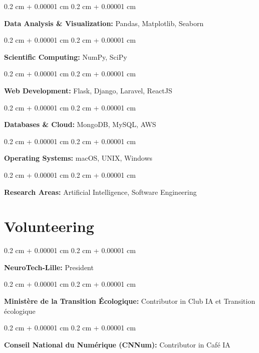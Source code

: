 \documentclass[10pt, letterpaper]{article}
\newenvironment{onecolentry}{
    \begin{adjustwidth}{
        0.2 cm + 0.00001 cm
    }{
        0.2 cm + 0.00001 cm
    }
}{
    \end{adjustwidth}
} %
\begin{document}
    \begin{onecolentry}
        \textbf{Data Analysis \& Visualization:} Pandas, Matplotlib, Seaborn
    \end{onecolentry}
    \vspace{0.2 cm}

    \begin{onecolentry}
        \textbf{Scientific Computing:} NumPy, SciPy
    \end{onecolentry}
    \vspace{0.2 cm}

    \begin{onecolentry}
        \textbf{Web Development:} Flask, Django, Laravel, ReactJS
    \end{onecolentry}
    \vspace{0.2 cm}

    \begin{onecolentry}
        \textbf{Databases \& Cloud:} MongoDB, MySQL, AWS
    \end{onecolentry}
    \vspace{0.2 cm}

    \begin{onecolentry}
        \textbf{Operating Systems:} macOS, UNIX, Windows
    \end{onecolentry}
    \vspace{0.2 cm}

    \begin{onecolentry}
        \textbf{Research Areas:} Artificial Intelligence, Software Engineering
    \end{onecolentry}


    \section{Volunteering}

    \begin{onecolentry}
        \textbf{NeuroTech-Lille:} President
    \end{onecolentry}
    \vspace{0.2 cm}

    \begin{onecolentry}
        \textbf{Ministère de la Transition Écologique:} Contributor in Club IA et Transition écologique
    \end{onecolentry}
    \vspace{0.2 cm}

    \begin{onecolentry}
        \textbf{Conseil National du Numérique (CNNum):} Contributor in Café IA
    \end{onecolentry}
    \vspace{0.2 cm}
\end{document}
